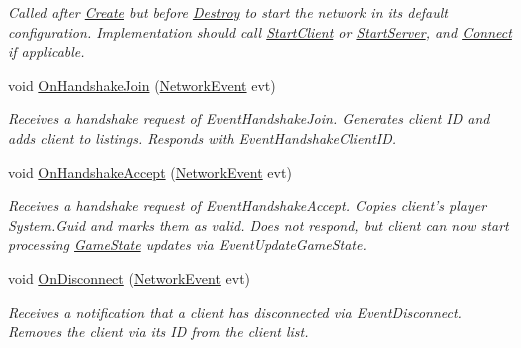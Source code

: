 \begin{DoxyCompactItemize}
\begin{DoxyCompactList}\small\item\em Called after \hyperlink{class_skyrates_1_1_common_1_1_network_1_1_network_common_a575172eb9f965e181e19649bcce38ca0}{Create} but before \hyperlink{class_skyrates_1_1_common_1_1_network_1_1_network_common_aa00266a16aa27dfd0eb242c74856a92a}{Destroy} to start the network in its default configuration. Implementation should call \hyperlink{class_skyrates_1_1_common_1_1_network_1_1_network_common_a982b732d621ff3f8738319053af8d154}{Start\-Client} or \hyperlink{class_skyrates_1_1_common_1_1_network_1_1_network_common_ac1209cf3fc31d2f145678971472ec20c}{Start\-Server}, and \hyperlink{class_skyrates_1_1_common_1_1_network_1_1_network_common_aa11961a4a6dc22c782552eb96e27c6e1}{Connect} if applicable.  \end{DoxyCompactList}\item 
void \hyperlink{class_skyrates_1_1_server_1_1_network_1_1_client_server_a616e25df08abf64f88a13963998946d6}{On\-Handshake\-Join} (\hyperlink{class_skyrates_1_1_common_1_1_network_1_1_event_1_1_network_event}{Network\-Event} evt)
\begin{DoxyCompactList}\small\item\em Receives a handshake request of Event\-Handshake\-Join. Generates client I\-D and adds client to listings. Responds with Event\-Handshake\-Client\-I\-D. \end{DoxyCompactList}\item 
void \hyperlink{class_skyrates_1_1_server_1_1_network_1_1_client_server_a78530cef0b66221a02afb62711ff8fe0}{On\-Handshake\-Accept} (\hyperlink{class_skyrates_1_1_common_1_1_network_1_1_event_1_1_network_event}{Network\-Event} evt)
\begin{DoxyCompactList}\small\item\em Receives a handshake request of Event\-Handshake\-Accept. Copies client's player System.\-Guid and marks them as valid. Does not respond, but client can now start processing \hyperlink{class_game_state}{Game\-State} updates via Event\-Update\-Game\-State. \end{DoxyCompactList}\item 
void \hyperlink{class_skyrates_1_1_server_1_1_network_1_1_client_server_a2c69e29494aa3decead4ed8546ad8c6a}{On\-Disconnect} (\hyperlink{class_skyrates_1_1_common_1_1_network_1_1_event_1_1_network_event}{Network\-Event} evt)
\begin{DoxyCompactList}\small\item\em Receives a notification that a client has disconnected via Event\-Disconnect. Removes the client via its I\-D from the client list. \end{DoxyCompactList}\item 

\end{DoxyCompactItemize}
